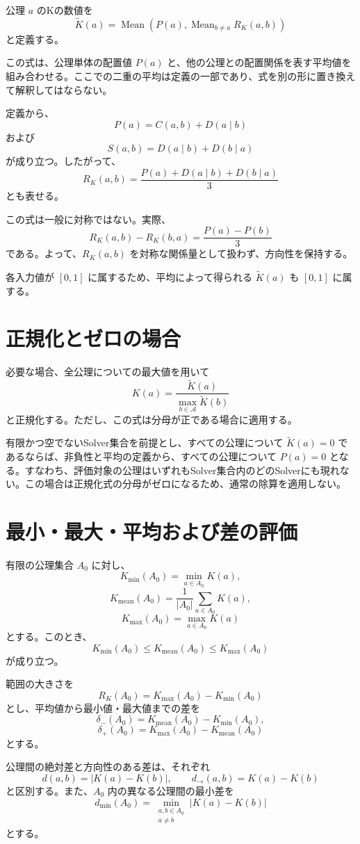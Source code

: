 \documentclass[a4paper,12pt]{article}
\begin{document}
公理 $a$ のKの数値を
\[
\boxed{
\widetilde K(a)
=
\operatorname{Mean}\left(
P(a),
\operatorname{Mean}_{b\ne a}R_K(a,b)
\right)
}
\]
と定義する。

この式は、公理単体の配置値 $P(a)$ と、他の公理との配置関係を表す平均値を組み合わせる。ここでの二重の平均は定義の一部であり、式を別の形に置き換えて解釈してはならない。

定義から、
\[
P(a)=C(a,b)+D(a\mid b)
\]
および
\[
S(a,b)=D(a\mid b)+D(b\mid a)
\]
が成り立つ。したがって、
\[
R_K(a,b)
=
\frac{P(a)+D(a\mid b)+D(b\mid a)}{3}
\]
とも表せる。

この式は一般に対称ではない。実際、
\[
R_K(a,b)-R_K(b,a)
=
\frac{P(a)-P(b)}{3}
\]
である。よって、$R_K(a,b)$ を対称な関係量として扱わず、方向性を保持する。

各入力値が $[0,1]$ に属するため、平均によって得られる $\widetilde K(a)$ も $[0,1]$ に属する。

\section{正規化とゼロの場合}

必要な場合、全公理についての最大値を用いて
\[
K(a)
=
\frac{\widetilde K(a)}
{\max_{b\in\mathcal{A}}\widetilde K(b)}
\]
と正規化する。ただし、この式は分母が正である場合に適用する。

有限かつ空でないSolver集合を前提とし、すべての公理について $\widetilde K(a)=0$ であるならば、非負性と平均の定義から、すべての公理について $P(a)=0$ となる。すなわち、評価対象の公理はいずれもSolver集合内のどのSolverにも現れない。この場合は正規化式の分母がゼロになるため、通常の除算を適用しない。

\section{最小・最大・平均および差の評価}

有限の公理集合 $A_0$ に対し、
\[
K_{\min}(A_0)=\min_{a\in A_0}K(a),
\]
\[
K_{\mathrm{mean}}(A_0)
=
\frac{1}{|A_0|}\sum_{a\in A_0}K(a),
\]
\[
K_{\max}(A_0)=\max_{a\in A_0}K(a)
\]
とする。このとき、
\[
K_{\min}(A_0)
\le K_{\mathrm{mean}}(A_0)
\le K_{\max}(A_0)
\]
が成り立つ。

範囲の大きさを
\[
R_K(A_0)=K_{\max}(A_0)-K_{\min}(A_0)
\]
とし、平均値から最小値・最大値までの差を
\[
\delta_-(A_0)=K_{\mathrm{mean}}(A_0)-K_{\min}(A_0),
\]
\[
\delta_+(A_0)=K_{\max}(A_0)-K_{\mathrm{mean}}(A_0)
\]
とする。

公理間の絶対差と方向性のある差は、それぞれ
\[
d(a,b)=|K(a)-K(b)|,
\qquad
d_{\to}(a,b)=K(a)-K(b)
\]
と区別する。また、$A_0$ 内の異なる公理間の最小差を
\[
d_{\min}(A_0)
=
\min_{\substack{a,b\in A_0\\a\ne b}}
|K(a)-K(b)|
\]
とする。
\end{document}
